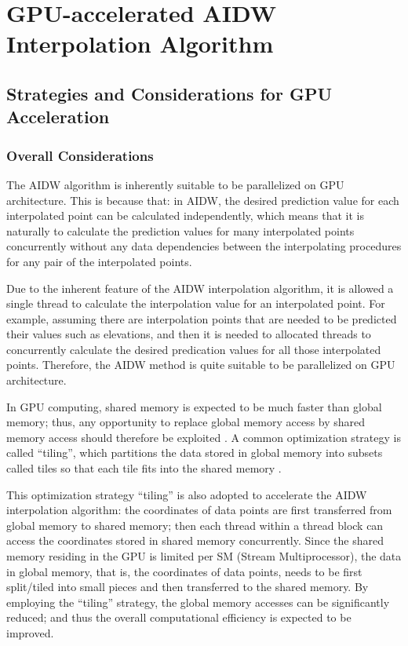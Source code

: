 \documentclass[fleqn,11pt]{wlscirep}
\begin{document}
\section{GPU-accelerated AIDW Interpolation Algorithm}
\label{sec3}
\subsection{Strategies and Considerations for GPU Acceleration}

\subsubsection{Overall Considerations}

The AIDW algorithm is inherently suitable to be parallelized on GPU 
architecture. This is because that: in AIDW, the desired prediction value 
for each interpolated point can be calculated independently, which means 
that it is naturally to calculate the prediction values for many 
interpolated points concurrently without any data dependencies between the 
interpolating procedures for any pair of the interpolated points.

Due to the inherent feature of the AIDW interpolation algorithm, it is 
allowed a single thread to calculate the interpolation value for an 
interpolated point. For example, assuming there are  interpolation points 
that are needed to be predicted their values such as elevations, and then it 
is needed to allocated  threads to concurrently calculate the desired 
predication values for all those  interpolated points. Therefore, the AIDW 
method is quite suitable to be parallelized on GPU architecture.

In GPU computing, shared memory is expected to be much faster than global 
memory; thus, any opportunity to replace global memory access by shared 
memory access should therefore be exploited \cite{06}. A common optimization 
strategy is called ``tiling'', which partitions the data stored in global 
memory into subsets called tiles so that each tile fits into the shared 
memory \cite{14}.

This optimization strategy ``tiling'' is also adopted to accelerate the AIDW 
interpolation algorithm: the coordinates of data points are first 
transferred from global memory to shared memory; then each thread within a 
thread block can access the coordinates stored in shared memory 
concurrently. Since the shared memory residing in the GPU is limited per SM 
(Stream Multiprocessor), the data in global memory, that is, the coordinates 
of data points, needs to be first split/tiled into small pieces and then 
transferred to the shared memory. By employing the ``tiling'' strategy, the 
global memory accesses can be significantly reduced; and thus the overall 
computational efficiency is expected to be improved.
\end{document}
